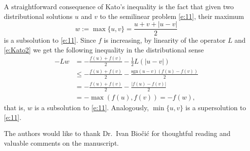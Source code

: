 \documentclass[a4paper,12pt,draft]{article}
\theoremstyle{plain}
\theoremstyle{definition}
\numberwithin{equation}{section}
\renewcommand{\le}{\leqslant}
\newcommand{\1}{1}
\begin{document}
A straightforward consequence of Kato's inequality is the fact that given two distributional solutions $u$ and $v$ to the semilinear problem \eqref{e:11}, their maximum
\[
w:=\max\{u,v\}=\frac{u+v+|u-v|}{2}
\]
is a subsolution to \eqref{e:11}.
Since $f$ is increasing, by linearity of the operator $L$ and \eqref{e:Kato2} we get the following inequality in the distributional sense
\begin{align*}
-Lw&=-\frac{f(u)+f(v)}{2}-\frac 1 2 L(|u-v|)\\
&\le -\frac{f(u)+f(v)}{2}-\frac{\text{sgn}(u-v)(f(u)-f(v))}2\\
&= -\frac{f(u)+f(v)}{2}-\frac{|f(u)-f(v)|}2\\
&= -\max(f(u),f(v))=-f(w),  
\end{align*}
that is, $w$ is a subsolution to \eqref{e:11}. Analogously, $\min\{u,v\}$ is a supersolution to \eqref{e:11}.


\vspace{1cm}

 The authors would like to thank Dr.~Ivan Biočić for thoughtful reading and valuable comments on the manuscript.
\end{document}
